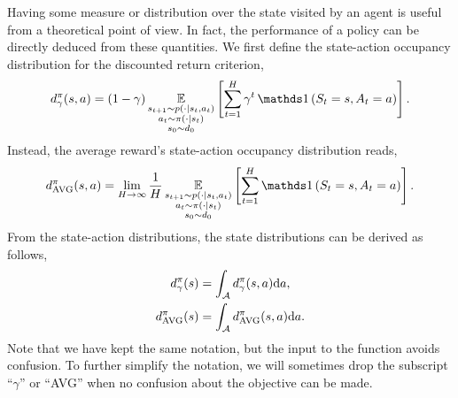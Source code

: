 Having some measure or distribution over the state visited by an agent is useful from a theoretical point of view. 
In fact, the performance of a policy can be directly deduced from these quantities.
We first define the state-action occupancy distribution for the discounted return criterion, 
\begin{align}
\label{def:discounted_state_distrib}
    \discountedstateoccupancydistribution[\gamma] (s,a)= (1-\gamma)\expectedvalue_{\substack{s_{t+1}\sim p(\cdot\vert s_t,a_t)\\a_t\sim\pi(\cdot\vert s_t)\\s_0\sim \initialstatedistribution}}\left[\sum_{t=1}^H \gamma^t \Ind\left(S_t=s, A_t=a\right)\right].
\end{align} 
Instead, the average reward's state-action occupancy distribution reads,
\begin{align*}
    \averagestateoccupancydistribution (s,a)= \lim_{H\rightarrow \infty}\frac{1}{H}\expectedvalue_{\substack{s_{t+1}\sim p(\cdot\vert s_t,a_t)\\a_t\sim\pi(\cdot\vert s_t)\\s_0\sim \initialstatedistribution}}\left[\sum_{t=1}^H \Ind\left(S_t=s, A_t=a\right)\right].
\end{align*}
From the state-action distributions, the state distributions can be derived as follows,
\begin{align*}
    \discountedstateoccupancydistribution[\gamma] (s)&=\int_\actionspace \discountedstateoccupancydistribution[\gamma] (s,a) \de a,
    \\
    \averagestateoccupancydistribution (s) &= \int_\actionspace\averagestateoccupancydistribution (s,a)\de a.
\end{align*}
Note that we have kept the same notation, but the input to the function avoids confusion. 
To further simplify the notation, we will sometimes drop the subscript ``$\gamma$'' or ``AVG'' when no confusion about the objective can be made.

